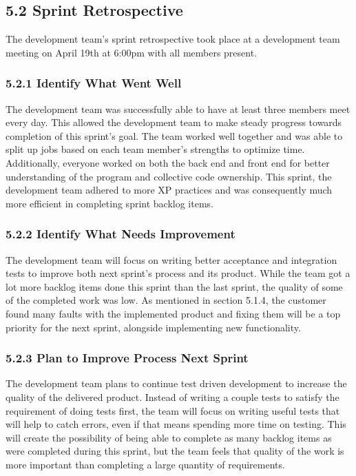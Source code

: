 \documentclass[]{article}
\begin{document}
\subsection{5.2 Sprint Retrospective}\label{sprint-retrospective}

The development team's sprint retrospective took place at a development
team meeting on April 19th at 6:00pm with all members present.

\subsubsection{5.2.1 Identify What Went
Well}\label{identify-what-went-well}

The development team was successfully able to have at least three
members meet every day. This allowed the development team to make steady
progress towards completion of this sprint's goal. The team worked well
together and was able to split up jobs based on each team member's
strengths to optimize time. Additionally, everyone worked on both the
back end and front end for better understanding of the program and
collective code ownership. This sprint, the development team adhered to
more XP practices and was consequently much more efficient in completing
sprint backlog items.

\subsubsection{5.2.2 Identify What Needs
Improvement}\label{identify-what-needs-improvement}

The development team will focus on writing better acceptance and
integration tests to improve both next sprint's process and its product.
While the team got a lot more backlog items done this sprint than the
last sprint, the quality of some of the completed work was low. As
mentioned in section 5.1.4, the customer found many faults with the
implemented product and fixing them will be a top priority for the next
sprint, alongside implementing new functionality.

\subsubsection{5.2.3 Plan to Improve Process Next
Sprint}\label{plan-to-improve-process-next-sprint}

The development team plans to continue test driven development to
increase the quality of the delivered product. Instead of writing a
couple tests to satisfy the requirement of doing tests first, the team
will focus on writing useful tests that will help to catch errors, even
if that means spending more time on testing. This will create the
possibility of being able to complete as many backlog items as were
completed during this sprint, but the team feels that quality of the
work is more important than completing a large quantity of requirements.
\end{document}
